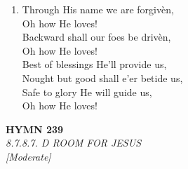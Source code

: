 \documentclass[11pt,a4paper]{article}
\begin{document}
\begin{enumerate}
    \item Through His name we are forgiv\`en, \\
            Oh how He loves! \\
        Backward shall our foes be driv\`en, \\
            Oh how He loves! \\
        Best of blessings He'll provide us, \\
        Nought but good shall e'er betide us, \\
        Safe to glory He will guide us, \\
            Oh how He loves!

\end{enumerate}

\newpage
\begin{center}
    {\Large \textbf{HYMN 239}}
    \\
    \textit{8.7.8.7. D ROOM FOR JESUS}
    \\
    \textit{\small [Moderate]}
\end{center}
\vspace{1em}
\end{document}

